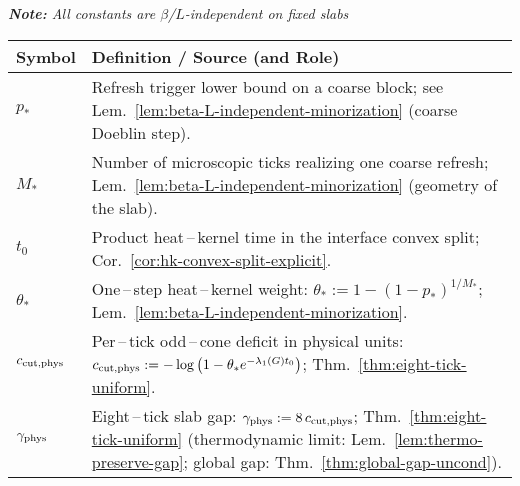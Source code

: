 \documentclass[11pt]{amsart}
\theoremstyle{plain}
\theoremstyle{definition}
\theoremstyle{remark}
\begin{document}
\begin{mdframed}[linewidth=0.8pt, linecolor=black!30, backgroundcolor=yellow!5, roundcorner=3pt, innertopmargin=12pt, innerbottommargin=12pt, skipabove=12pt, skipbelow=12pt]
\begin{center}
\textit{\textbf{Note:} All constants are $\beta$/$L$-independent on fixed slabs}
\end{center}
\vspace{10pt}
\renewcommand{\arraystretch}{1.5}
\begin{center}
\begin{tabular}{@{}lp{9cm}@{}}
\toprule
\textbf{Symbol} & \textbf{Definition / Source (and Role)} \\
\midrule
$p_*$ & Refresh trigger lower bound on a coarse block; see Lem.~\ref{lem:beta-L-independent-minorization} (coarse Doeblin step). \\
$M_*$ & Number of microscopic ticks realizing one coarse refresh; Lem.~\ref{lem:beta-L-independent-minorization} (geometry of the slab). \\
$t_0$ & Product heat\,–\,kernel time in the interface convex split; Cor.~\ref{cor:hk-convex-split-explicit}. \\
$\theta_*$ & One\,–\,step heat\,–\,kernel weight: $\theta_*:=1-(1-p_*)^{1/M_*}$; Lem.~\ref{lem:beta-L-independent-minorization}. \\
$c_{\rm cut,phys}$ & Per\,–\,tick odd\,–\,cone deficit in physical units: $c_{\rm cut,phys}:= -\log\big(1-\theta_* e^{-\lambda_1(G) t_0}\big)$; Thm.~\ref{thm:eight-tick-uniform}. \\
$\gamma_{\rm phys}$ & Eight\,–\,tick slab gap: $\gamma_{\rm phys}:= 8\,c_{\rm cut,phys}$; Thm.~\ref{thm:eight-tick-uniform} (thermodynamic limit: Lem.~\ref{lem:thermo-preserve-gap}; global gap: Thm.~\ref{thm:global-gap-uncond}). \\
\bottomrule
\end{tabular}
\end{center}
\end{mdframed}
\end{document}

